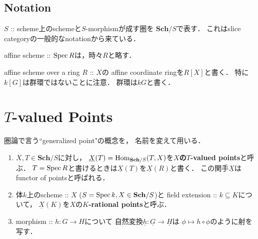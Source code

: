 \documentclass[a4paper]{jsarticle}
\newcommand{\Sch}{\mathbf{Sch}}
\newcommand{\func}[1]{\underline{#1}}
\begin{document}
\subsection*{Notation}
    $S$ :: scheme上のschemeと$S$-morphismが成す圏を
    \textbf{$\Sch/S$}で表す．
    これはslice categoryの一般的なnotationから来ている．
    
    affine scheme :: $\operatorname{Spec} R$は，時々$R$と略す．

    affine scheme over a ring $R$ :: $X$の
    affine coordinate ringを$R[X]$と書く．
    特に$k[G]$は群環ではないことに注意．
    群環は$kG$と書く．

\section{\texorpdfstring{$T$}{T}-valued Points}
    圏論で言う``generalized point"の概念を，
    名前を変えて用いる．

    \begin{Def}
    \enumfix
    \begin{enumerate}[label=(\roman*),leftmargin=*]
    \item 
    $X, T \in \Sch/S$に対し，
    $\func{X}(T)=\Hom_{\Sch/S}(T,X)$を\textbf{$X$の$T$-valued points}と呼ぶ．
    $T=\operatorname{Spec} R$と書けるときは$\func{X}(T)$を$\func{X}(R)$と書く．
    この関手$\func{X}$はfunctor of pointsと呼ばれる．

    \item
    体$k$上のscheme :: $X$ ($S=\Spec k, X \in \Sch/S$)と
    field extension :: $k \subseteq K$について，
    $\func{X}(K)$を$X$の\textbf{$K$-rational points}と呼ぶ．

    \item
    morphism :: $h: G \to H$について
    自然変換$\func{h}: \func{G} \to \func{H}$は
    $\phi \mapsto h \circ \phi$のように射を写す．
    \end{enumerate}
    \end{Def}
\end{document}
